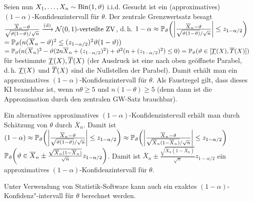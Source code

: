 \begin{Bsp}
    Seien nun $X_1, \dotsc, X_n \sim \operatorname{Bin}(1, \vartheta)$ i.i.d.
    Gesucht ist ein (approximatives) $(1 - \alpha)$-Konfidenzintervall für $\theta$.
    Der zentrale Grenzwertsatz besagt\\
    $\frac{\overline{X}_n - \vartheta}{\sqrt{\vartheta (1 - \vartheta)}/\sqrt{n}} \xrightarrow{\text{(d)}}
    \mathcal{N}(0, 1)\text{-verteilte ZV}$,
    d.\,h. $1 - \alpha \approx \mathbb{P}_\vartheta\!\left(\left|\frac{\overline{X}_n - \vartheta}
    {\sqrt{\vartheta (1 - \vartheta)}/\sqrt{n}}\right| \le z_{1-\alpha/2}\right)$\\
    $= \mathbb{P}_\vartheta(n (\overline{X}_n - \vartheta)^2 \le (z_{1-\alpha/2})^2 \vartheta (1 - \vartheta))$\\
    $= \mathbb{P}_\vartheta(n (\overline{X}_n)^2 - \vartheta (2n \overline{X}_n + (z_{1-\alpha/2})^2) +
    \vartheta^2 (n + (z_{1-\alpha/2})^2) \le 0) = \mathbb{P}_\vartheta(\vartheta \in [\underline{T}(X), \overline{T}(X)])$\\
    für bestimmte $\underline{T}(X), \overline{T}(X)$
    (der Ausdruck ist eine nach oben geöffnete Parabel, d.\,h. $\underline{T}(X)$ und $\overline{T}(X)$ sind die
    Nullstellen der Parabel).
    Damit erhält man ein approximatives $(1 - \alpha)$-Konfidenzintervall für $\theta$.
    Als Faustregel gilt, dass dieses KI brauchbar ist, wenn $n\theta \ge 5$ und
    $n(1-\theta) \ge 5$
    (denn dann ist die Approximation durch den zentralen GW-Satz brauchbar).
    
    Ein alternatives approximatives $(1 - \alpha)$-Konfidenzintervall erhält man durch
    Schätzung von $\theta$ durch $\overline{X}_n$.
    Damit ist
    $(1 - \alpha) \approx \mathbb{P}_\vartheta\!\left(\left|\frac{\overline{X}_n - \vartheta}
    {\sqrt{\vartheta (1 - \vartheta)}/\sqrt{n}}\right| \le z_{1-\alpha/2}\right)
    \approx \mathbb{P}_\vartheta\!\left(\left|\frac{\overline{X}_n - \vartheta}
    {\sqrt{\overline{X}_n (1 - \overline{X}_n)}/\sqrt{n}}\right| \le z_{1-\alpha/2}\right)$\\
    $\mathbb{P}_\vartheta\!\left(\vartheta \in \overline{X}_n \pm
    \frac{\sqrt{\overline{X}_n (1 - \overline{X}_n)}}{\sqrt{n}} z_{1 - \alpha/2}\right)$.
    Damit ist $\overline{X}_n \pm
    \frac{\sqrt{\overline{X}_n (1 - \overline{X}_n)}}{\sqrt{n}} z_{1 - \alpha/2}$ ein
    approximatives $(1 - \alpha)$-Konfidenzintervall für $\theta$.
\end{Bsp}

\begin{Bem}
    Unter Verwendung von Statistik-Software kann auch ein exaktes
    $(1 - \alpha)$-Konfidenz"-intervall für $\theta$ berechnet werden.
\end{Bem}


